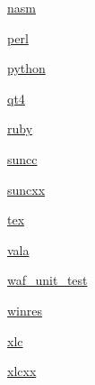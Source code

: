 \begin{DoxyCompactItemize}
 \hyperlink{namespacewaflib_1_1_tools_1_1nasm}{nasm}
\item 
 \hyperlink{namespacewaflib_1_1_tools_1_1perl}{perl}
\item 
 \hyperlink{namespacewaflib_1_1_tools_1_1python}{python}
\item 
 \hyperlink{namespacewaflib_1_1_tools_1_1qt4}{qt4}
\item 
 \hyperlink{namespacewaflib_1_1_tools_1_1ruby}{ruby}
\item 
 \hyperlink{namespacewaflib_1_1_tools_1_1suncc}{suncc}
\item 
 \hyperlink{namespacewaflib_1_1_tools_1_1suncxx}{suncxx}
\item 
 \hyperlink{namespacewaflib_1_1_tools_1_1tex}{tex}
\item 
 \hyperlink{namespacewaflib_1_1_tools_1_1vala}{vala}
\item 
 \hyperlink{namespacewaflib_1_1_tools_1_1waf__unit__test}{waf\+\_\+unit\+\_\+test}
\item 
 \hyperlink{namespacewaflib_1_1_tools_1_1winres}{winres}
\item 
 \hyperlink{namespacewaflib_1_1_tools_1_1xlc}{xlc}
\item 
 \hyperlink{namespacewaflib_1_1_tools_1_1xlcxx}{xlcxx}
\end{DoxyCompactItemize}
